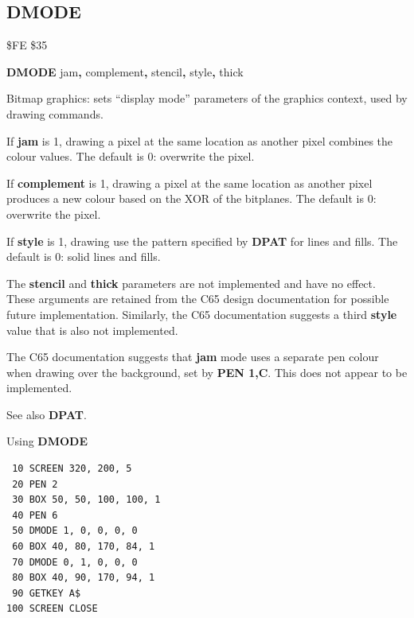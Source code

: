 
\newpage
\subsection{DMODE}
\begin{description}[leftmargin=2cm,style=nextline]
\item [Token:]    \$FE \$35
\item [Format:]   {\bf DMODE} jam{\bf,} complement{\bf,} stencil{\bf,} style{\bf,} thick
\item [Usage:]    Bitmap graphics: sets ``display mode'' parameters of the graphics context, used by drawing commands.

                  If {\bf jam} is 1, drawing a pixel at the same location as another pixel combines the colour values. The default is 0: overwrite the pixel.

                  If {\bf complement} is 1, drawing a pixel at the same location as another pixel produces a new colour based on the XOR of the bitplanes. The default is 0: overwrite the pixel.

                  If {\bf style} is 1, drawing use the pattern specified by {\bf DPAT} for lines and fills. The default is 0: solid lines and fills.

\item[Remarks:]   The {\bf stencil} and {\bf thick} parameters are not implemented and have no effect. These arguments are retained from the C65 design documentation for possible future implementation. Similarly, the C65 documentation suggests a third {\bf style} value that is also not implemented.

                  The C65 documentation suggests that {\bf jam} mode uses a separate pen colour when drawing over the background, set by {\bf PEN 1,C}. This does not appear to be implemented.

                  See also {\bf DPAT}.

\item [Example:]  Using {\bf DMODE}

\begin{tcolorbox}[colback=black,coltext=white]
\verbatimfont{\codefont}
\begin{verbatim}
 10 SCREEN 320, 200, 5
 20 PEN 2
 30 BOX 50, 50, 100, 100, 1
 40 PEN 6
 50 DMODE 1, 0, 0, 0, 0
 60 BOX 40, 80, 170, 84, 1
 70 DMODE 0, 1, 0, 0, 0
 80 BOX 40, 90, 170, 94, 1
 90 GETKEY A$
100 SCREEN CLOSE
\end{verbatim}
\end{tcolorbox}
\end{description}

